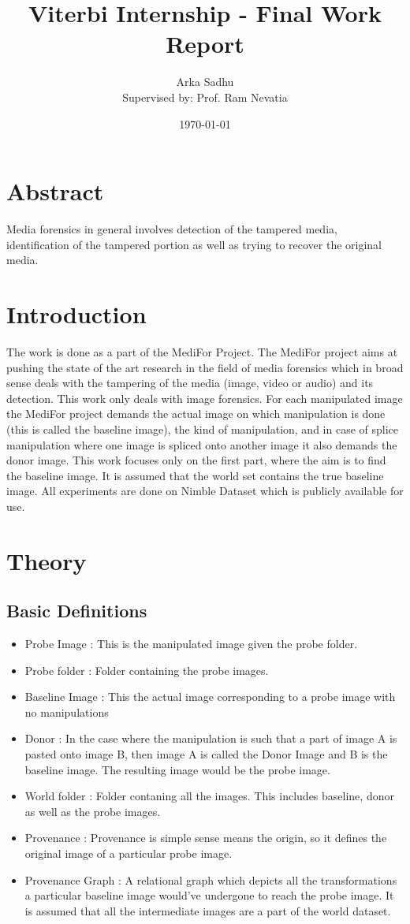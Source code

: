 \documentclass{article}
\title{Viterbi Internship - Final Work Report}
\author{Arka Sadhu\\{ Supervised by: Prof. Ram Nevatia}}
\date{\today}
\begin{document}
\maketitle

\tableofcontents
\newpage

\section{Abstract}
Media forensics in general involves detection of the tampered media, identification of the tampered portion as well as trying to recover the original media.

\section{Introduction}
The work is done as a part of the MediFor Project. The MediFor project aims at pushing the state of the art research in the field of media forensics which in broad sense deals with the tampering of the media (image, video or audio) and its detection. This work only deals with image forensics. For each manipulated image the MediFor project demands the actual image on which manipulation is done (this is called the baseline image), the kind of manipulation, and in case of splice manipulation where one image is spliced onto another image it also demands the donor image. This work focuses only on the first part, where the aim is to find the baseline image. It is assumed that the world set contains the true baseline image. All experiments are done on Nimble Dataset which is publicly available for use.

\section{Theory}
\subsection{Basic Definitions}
\begin{itemize}
\item Probe Image : This is the manipulated image given the probe folder.
\item Probe folder : Folder containing the probe images.
\item Baseline Image : This the actual image corresponding to a probe image with no manipulations
\item Donor : In the case where the manipulation is such that a part of image A is pasted onto image B, then image A is called the Donor Image and B is the baseline image. The resulting image would be the probe image.
\item World folder : Folder contaning all the images. This includes baseline, donor as well as the probe images.
\item Provenance : Provenance is simple sense means the origin, so it defines the original image of a particular probe image.
\item Provenance Graph : A relational graph which depicts all the transformations a particular baseline image would've undergone to reach the probe image. It is assumed that all the intermediate images are a part of the world dataset.
\end{itemize}
\end{document}
